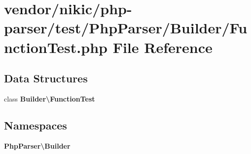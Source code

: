 \section{vendor/nikic/php-\/parser/test/\+Php\+Parser/\+Builder/\+Function\+Test.php File Reference}
\label{nikic_2php-parser_2test_2_php_parser_2_builder_2_function_test_8php}
\subsection*{Data Structures}
\begin{DoxyCompactItemize}
\item 
class {\bf Builder\textbackslash{}\+Function\+Test}
\end{DoxyCompactItemize}
\subsection*{Namespaces}
\begin{DoxyCompactItemize}
\item 
 {\bf Php\+Parser\textbackslash{}\+Builder}
\end{DoxyCompactItemize}
